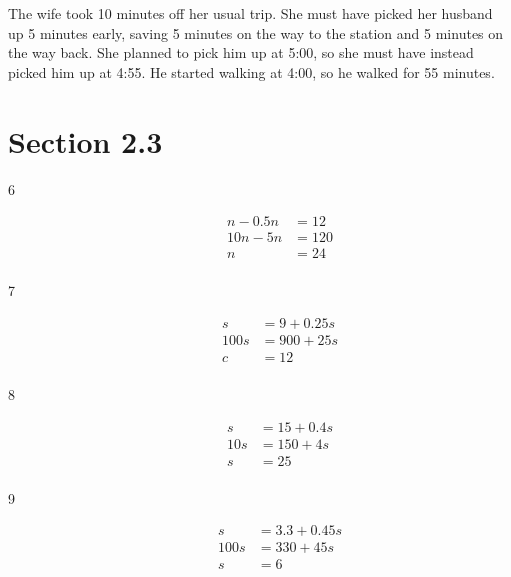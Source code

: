 \documentclass[letterpaper, landscape]{exam}
\begin{document}
  \begin{solution}
    The wife took 10 minutes off her usual trip.  She must have picked her husband up 5 minutes early, saving 5
    minutes on the way to the station and 5 minutes on the way back.  She planned to pick him up at 5:00, so she must
    have instead picked him up at 4:55.  He started walking at 4:00, so he walked for 55 minutes.
  \end{solution}

  \ifprintanswers{}
      
    \section{Section 2.3}

    \begin{description}

      \item[6]
        \begin{align*}
          n - 0.5n & = 12 \\
          10n - 5n & = 120 \\
          n        & = \boxed{ 24 } \\
        \end{align*}

      \item[7]
        \begin{align*}
          s     & = 9 + 0.25 s \\
          100 s & = 900 + 25 s \\
          c     & = \boxed{ 12 } \\
        \end{align*}

      \item[8]
        \begin{align*}
          s   & = 15 + 0.4s \\
          10s & = 150 + 4s \\
          s   & = \boxed{ 25 } \\
        \end{align*}

      \item[9]
        \begin{align*}
          s    & = 3.3 + 0.45s \\
          100s & = 330 + 45 s \\
          s    & = \boxed{ 6 } \\
        \end{align*}


\end{description}
\end{document}

